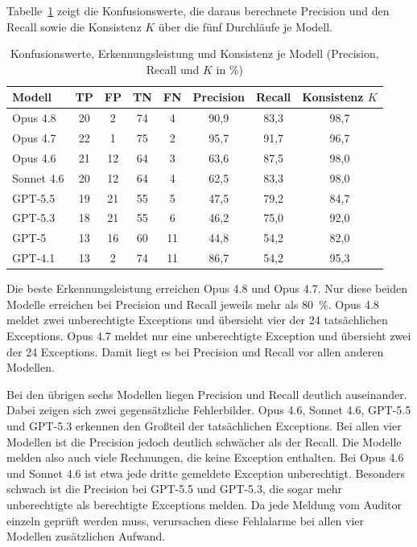 Tabelle~\ref{tab:ergebnisse} zeigt die Konfusionswerte, die daraus berechnete Precision und den Recall sowie die Konsistenz $K$ über die fünf Durchläufe je Modell.

\begin{table}[H]
  \centering
  \begin{tabular}{lccccccc}
    \hline
    Modell & TP & FP & TN & FN & Precision & Recall & Konsistenz $K$ \\
    \hline
    Opus 4.8   & 20 &  2 & 74 &  4 & 90,9 & 83,3 & 98,7 \\
    Opus 4.7   & 22 &  1 & 75 &  2 & 95,7 & 91,7 & 96,7 \\
    Opus 4.6   & 21 & 12 & 64 &  3 & 63,6 & 87,5 & 98,0 \\
    Sonnet 4.6 & 20 & 12 & 64 &  4 & 62,5 & 83,3 & 98,0 \\
    GPT-5.5    & 19 & 21 & 55 &  5 & 47,5 & 79,2 & 84,7 \\
    GPT-5.3    & 18 & 21 & 55 &  6 & 46,2 & 75,0 & 92,0 \\
    GPT-5      & 13 & 16 & 60 & 11 & 44,8 & 54,2 & 82,0 \\
    GPT-4.1    & 13 &  2 & 74 & 11 & 86,7 & 54,2 & 95,3 \\
    \hline
  \end{tabular}
  \caption{Konfusionswerte, Erkennungsleistung und Konsistenz je Modell (Precision, Recall und $K$ in \%)}
  \label{tab:ergebnisse}
\end{table}

Die beste Erkennungsleistung erreichen Opus 4.8 und Opus 4.7. Nur diese beiden Modelle erreichen bei Precision und Recall jeweils mehr als 80~\%. Opus 4.8 meldet zwei unberechtigte Exceptions und übersieht vier der 24 tatsächlichen Exceptions. Opus 4.7 meldet nur eine unberechtigte Exception und übersieht zwei der 24 Exceptions. Damit liegt es bei Precision und Recall vor allen anderen Modellen.

Bei den übrigen sechs Modellen liegen Precision und Recall deutlich auseinander. Dabei zeigen sich zwei gegensätzliche Fehlerbilder. Opus 4.6, Sonnet 4.6, GPT-5.5 und GPT-5.3 erkennen den Großteil der tatsächlichen Exceptions. Bei allen vier Modellen ist die Precision jedoch deutlich schwächer als der Recall. Die Modelle melden also auch viele Rechnungen, die keine Exception enthalten. Bei Opus 4.6 und Sonnet 4.6 ist etwa jede dritte gemeldete Exception unberechtigt. Besonders schwach ist die Precision bei GPT-5.5 und GPT-5.3, die sogar mehr unberechtigte als berechtigte Exceptions melden. Da jede Meldung vom Auditor einzeln geprüft werden muss, verursachen diese Fehlalarme bei allen vier Modellen zusätzlichen Aufwand.

